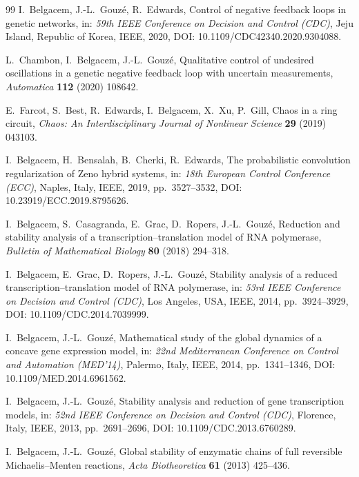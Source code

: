 \documentclass[sn-mathphys,Numbered]{sn-jnl}
\theoremstyle{thmstyleone}
\theoremstyle{thmstyletwo}
\theoremstyle{thmstylethree}
\begin{document}
\begin{thebibliography}{99}
I.~Belgacem, J.-L.~Gouz\'e, R.~Edwards,
Control of negative feedback loops in genetic networks,
in: \emph{59th IEEE Conference on Decision and Control (CDC)},
Jeju Island, Republic of Korea, IEEE, 2020,
DOI: 10.1109/CDC42340.2020.9304088.

L.~Chambon, I.~Belgacem, J.-L.~Gouz\'e,
Qualitative control of undesired oscillations in a genetic negative
feedback loop with uncertain measurements,
\emph{Automatica} \textbf{112} (2020) 108642.

E.~Farcot, S.~Best, R.~Edwards, I.~Belgacem, X.~Xu, P.~Gill,
Chaos in a ring circuit,
\emph{Chaos: An Interdisciplinary Journal of Nonlinear Science}
\textbf{29} (2019) 043103.

I.~Belgacem, H.~Bensalah, B.~Cherki, R.~Edwards,
The probabilistic convolution regularization of Zeno hybrid systems,
in: \emph{18th European Control Conference (ECC)}, Naples, Italy, IEEE,
2019, pp.~3527--3532, DOI: 10.23919/ECC.2019.8795626.

I.~Belgacem, S.~Casagranda, E.~Grac, D.~Ropers, J.-L.~Gouz\'e,
Reduction and stability analysis of a transcription--translation model
of RNA polymerase,
\emph{Bulletin of Mathematical Biology} \textbf{80} (2018) 294--318.

I.~Belgacem, E.~Grac, D.~Ropers, J.-L.~Gouz\'e,
Stability analysis of a reduced transcription--translation model of RNA
polymerase,
in: \emph{53rd IEEE Conference on Decision and Control (CDC)}, Los
Angeles, USA, IEEE, 2014, pp.~3924--3929,
DOI: 10.1109/CDC.2014.7039999.

I.~Belgacem, J.-L.~Gouz\'e,
Mathematical study of the global dynamics of a concave gene expression
model,
in: \emph{22nd Mediterranean Conference on Control and Automation
(MED'14)}, Palermo, Italy, IEEE, 2014, pp.~1341--1346,
DOI: 10.1109/MED.2014.6961562.

I.~Belgacem, J.-L.~Gouz\'e,
Stability analysis and reduction of gene transcription models,
in: \emph{52nd IEEE Conference on Decision and Control (CDC)}, Florence,
Italy, IEEE, 2013, pp.~2691--2696, DOI: 10.1109/CDC.2013.6760289.

I.~Belgacem, J.-L.~Gouz\'e,
Global stability of enzymatic chains of full reversible
Michaelis--Menten reactions,
\emph{Acta Biotheoretica} \textbf{61} (2013) 425--436.


\end{thebibliography}
\end{document}

